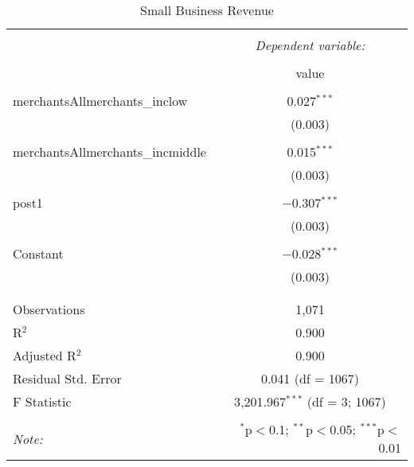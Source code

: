 
\begin{table}[!htbp] \centering 
  \caption{Small Business Revenue} 
  \label{} 
\begin{tabular}{@{\extracolsep{5pt}}lc} 
\\[-1.8ex]\hline 
\hline \\[-1.8ex] 
 & \multicolumn{1}{c}{\textit{Dependent variable:}} \\ 
\cline{2-2} 
\\[-1.8ex] & value \\ 
\hline \\[-1.8ex] 
 merchantsAllmerchants\_inclow & 0.027$^{***}$ \\ 
  & (0.003) \\ 
  & \\ 
 merchantsAllmerchants\_incmiddle & 0.015$^{***}$ \\ 
  & (0.003) \\ 
  & \\ 
 post1 & $-$0.307$^{***}$ \\ 
  & (0.003) \\ 
  & \\ 
 Constant & $-$0.028$^{***}$ \\ 
  & (0.003) \\ 
  & \\ 
\hline \\[-1.8ex] 
Observations & 1,071 \\ 
R$^{2}$ & 0.900 \\ 
Adjusted R$^{2}$ & 0.900 \\ 
Residual Std. Error & 0.041 (df = 1067) \\ 
F Statistic & 3,201.967$^{***}$ (df = 3; 1067) \\ 
\hline 
\hline \\[-1.8ex] 
\textit{Note:}  & \multicolumn{1}{r}{$^{*}$p$<$0.1; $^{**}$p$<$0.05; $^{***}$p$<$0.01} \\ 
\end{tabular} 
\end{table} 
